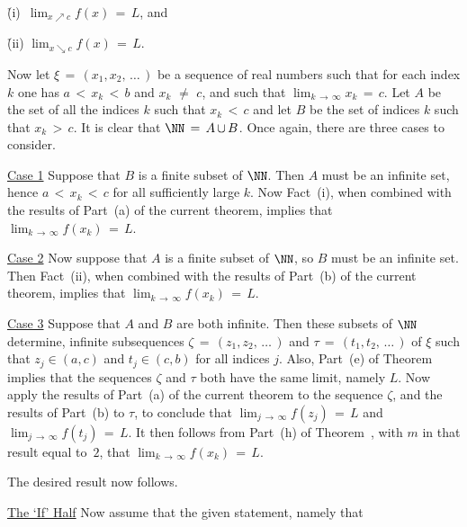 {        \h (i)\, ${\displaystyle \lim_{x{\nearrow}c} f(x) \,=\, L}$, and 

        \h (ii) ${\displaystyle \lim_{x{\searrow}c} f(x) \,=\, L}$.

\noindent Now let ${\xi} \,=\, (x_{1},x_{2},\,{\ldots}\,)$ be a sequence of real numbers such that for each index $k$ one has $a\,<\,x_{k}\,<\,b$ and $x_{k} \,\,{\neq}\,\, c$,
    and such that ${\displaystyle \lim_{k \,{\rightarrow}\, {\infty}} x_{k} \,=\, c}$.
    Let $A$ be the set of all the indices $k$ such that $x_{k}\,<\,c$ and let $B$ be the set of indices $k$ such that $x_{k}\,>\,c$.
    It is clear that ${\NN} \,=\, A\,{\cup}\,B$.
    Once again, there are three cases to consider.

        \underline{Case 1} Suppose that $B$ is a finite subset of ${\NN}$.
    Then $A$ must be an infinite set,
    hence $a\,<\,x_{k}\,<\,c$ for all sufficiently large $k$. Now Fact~(i), when combined with the results of Part~(a) of the current theorem,
    implies that ${\displaystyle \lim_{k \,{\rightarrow}\, {\infty}} f(x_{k}) \,=\, L}$.

        \underline{Case 2} Now suppose that $A$ is a finite subset of ${\NN}$, so $B$ must be an infinite set.
    Then Fact~(ii), when combined with the results of Part~(b) of the current theorem,
    implies that ${\displaystyle \lim_{k \,{\rightarrow}\, {\infty}} f(x_{k}) \,=\, L}$.

        \underline{Case 3} Suppose that $A$ and $B$ are both infinite.
    Then these subsets of ${\NN}$ determine, infinite subsequences ${\zeta} \,=\, (z_{1},z_{2},\,{\ldots}\,)$ and ${\tau} \,=\, (t_{1},t_{2},\,{\ldots}\,)$
    of ${\xi}$ such that $z_{j}{\in}(a,c)$ and $t_{j}{\in}(c,b)$ for all indices $j$.
    Also, Part~(e) of Theorem~ implies that the sequences ${\zeta}$ and ${\tau}$ both have the same limit, namely $L$.
    Now apply the results of Part~(a) of the current theorem to the sequence ${\zeta}$, and the results of Part~(b) to ${\tau}$,
    to conclude that ${\displaystyle \lim_{j \,{\rightarrow}\, {\infty}} f(z_{j}) \,=\, L}$ and
    ${\displaystyle \lim_{j \,{\rightarrow}\, {\infty}} f(t_{j}) \,=\, L}$.
    It then follows from Part~(h) of Theorem~, with $m$ in that result equal to~$2$,
    that ${\displaystyle \lim_{k \,{\rightarrow}\, {\infty}} f(x_{k}) \,=\, L}$.

        The desired result now follows.

        \underline{The `If' Half} Now assume that the given statement, namely that

}
